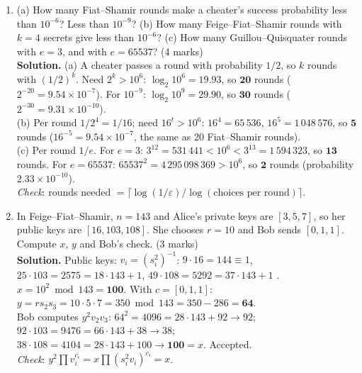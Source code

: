 \begin{enumerate}[leftmargin=1.6em,itemsep=4pt]
  \item (a) How many Fiat--Shamir rounds make a cheater's success probability less than $10^{-6}$? Less than $10^{-9}$? (b) How many Feige--Fiat--Shamir rounds with $k = 4$ secrets give less than $10^{-6}$? (c) How many Guillou--Quisquater rounds with $e = 3$, and with $e = 65537$? \hfill (4 marks)\\
  \textbf{Solution.} (a) A cheater passes a round with probability $1/2$, so $k$ rounds with $(1/2)^k$. Need $2^k > 10^6$: $\log_2 10^6 = 19.93$, so $\mathbf{20}$ rounds ($2^{-20} = 9.54 \times 10^{-7}$). For $10^{-9}$: $\log_2 10^9 = 29.90$, so $\mathbf{30}$ rounds ($2^{-30} = 9.31 \times 10^{-10}$).\\
  (b) Per round $1/2^4 = 1/16$; need $16^t > 10^6$: $16^4 = 65\,536$, $16^5 = 1\,048\,576$, so $\mathbf{5}$ rounds ($16^{-5} = 9.54 \times 10^{-7}$, the same as 20 Fiat--Shamir rounds).\\
  (c) Per round $1/e$. For $e = 3$: $3^{12} = 531\,441 < 10^6 < 3^{13} = 1\,594\,323$, so $\mathbf{13}$ rounds. For $e = 65537$: $65537^2 = 4\,295\,098\,369 > 10^6$, so $\mathbf{2}$ rounds (probability $2.33 \times 10^{-10}$).\\
  \emph{Check}: rounds needed $= \lceil \log(1/\varepsilon) / \log(\text{choices per round}) \rceil$.

  \item In Feige--Fiat--Shamir, $n = 143$ and Alice's private keys are $[3, 5, 7]$, so her public keys are $[16, 103, 108]$. She chooses $r = 10$ and Bob sends $[0, 1, 1]$. Compute $x$, $y$ and Bob's check. \hfill (3 marks)\\
  \textbf{Solution.} Public keys: $v_i = (s_i^2)^{-1}$: $9 \cdot 16 = 144 \equiv 1$, $25 \cdot 103 = 2575 = 18 \cdot 143 + 1$, $49 \cdot 108 = 5292 = 37 \cdot 143 + 1$ \checkmark.\\
  $x = 10^2 \bmod 143 = \mathbf{100}$. With $c = [0, 1, 1]$: $y = r s_2 s_3 = 10 \cdot 5 \cdot 7 = 350 \bmod 143 = 350 - 286 = \mathbf{64}$.\\
  Bob computes $y^2 v_2 v_3$: $64^2 = 4096 = 28 \cdot 143 + 92 \to 92$; $92 \cdot 103 = 9476 = 66 \cdot 143 + 38 \to 38$; $38 \cdot 108 = 4104 = 28 \cdot 143 + 100 \to \mathbf{100} = x$. Accepted.\\
  \emph{Check}: $y^2 \prod v_i^{c_i} = x \prod (s_i^2 v_i)^{c_i} = x$.


\end{enumerate}

